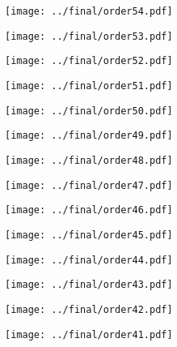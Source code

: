 \documentclass{article}
\begin{document}
\begin{figure}[H]
    \centering
    \texttt{[image: ../final/order54.pdf]}
\end{figure}
\begin{figure}[H]
    \centering
    \texttt{[image: ../final/order53.pdf]}
\end{figure}
\begin{figure}[H]
    \centering
    \texttt{[image: ../final/order52.pdf]}
\end{figure}
\begin{figure}[H]
    \centering
    \texttt{[image: ../final/order51.pdf]}
\end{figure}
\begin{figure}[H]
    \centering
    \texttt{[image: ../final/order50.pdf]}
\end{figure}
\begin{figure}[H]
    \centering
    \texttt{[image: ../final/order49.pdf]}
\end{figure}
\begin{figure}[H]
    \centering
    \texttt{[image: ../final/order48.pdf]}
\end{figure}
\begin{figure}[H]
    \centering
    \texttt{[image: ../final/order47.pdf]}
\end{figure}
\begin{figure}[H]
    \centering
    \texttt{[image: ../final/order46.pdf]}
\end{figure}
\begin{figure}[H]
    \centering
    \texttt{[image: ../final/order45.pdf]}
\end{figure}
\begin{figure}[H]
    \centering
    \texttt{[image: ../final/order44.pdf]}
\end{figure}
\begin{figure}[H]
    \centering
    \texttt{[image: ../final/order43.pdf]}
\end{figure}
\begin{figure}[H]
    \centering
    \texttt{[image: ../final/order42.pdf]}
\end{figure}
\begin{figure}[H]
    \centering
    \texttt{[image: ../final/order41.pdf]}
\end{figure}
\end{document}
